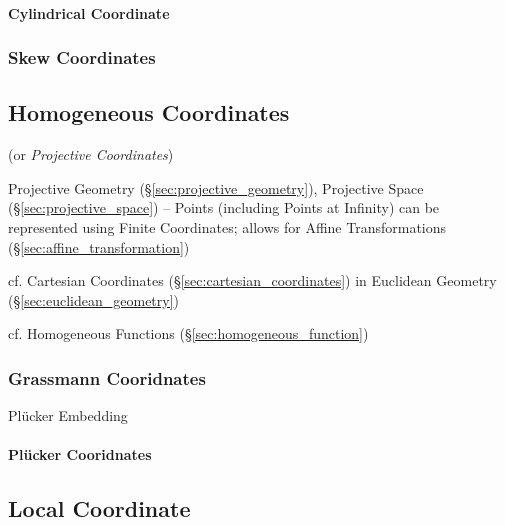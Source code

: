 \paragraph{Cylindrical Coordinate}\label{sec:cylindrical_coordinates}\hfill



\subsubsection{Skew Coordinates}\label{sec:skew_coordinates}



\subsection{Homogeneous Coordinates}\label{sec:homogeneous_coordinates}

(or \emph{Projective Coordinates})

Projective Geometry (\S\ref{sec:projective_geometry}), Projective
Space (\S\ref{sec:projective_space}) -- Points (including Points at
Infinity) can be represented using Finite Coordinates; allows for
Affine Transformations (\S\ref{sec:affine_transformation})

\fist cf. Cartesian Coordinates (\S\ref{sec:cartesian_coordinates}) in
Euclidean Geometry (\S\ref{sec:euclidean_geometry})

\fist cf. Homogeneous Functions (\S\ref{sec:homogeneous_function})



\subsubsection{Grassmann Cooridnates}\label{sec:grassmann_coordinates}

Pl\"ucker Embedding



\paragraph{Pl\"ucker Cooridnates}\label{sec:plucker_coordinates}\hfill



\subsection{Local Coordinate}\label{sec:local_coordinate}

